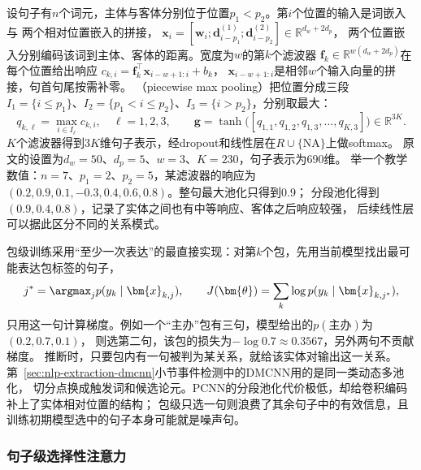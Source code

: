 设句子有$n$个词元，主体与客体分别位于位置$p_1<p_2$。第$i$个位置的输入是词嵌入与
两个相对位置嵌入的拼接，
$\bm{x}_i=[\bm{w}_i;\bm{d}^{(1)}_{i-p_1};\bm{d}^{(2)}_{i-p_2}]\in\mathbb{R}^{d_w+2d_p}$，
两个位置嵌入分别编码该词到主体、客体的距离。宽度为$w$的第$k$个滤波器
$\bm{f}_k\in\mathbb{R}^{w(d_w+2d_p)}$在每个位置给出响应
$c_{k,i}=\bm{f}_k^{\top}\bm{x}_{i-w+1:i}+b_k$，
$\bm{x}_{i-w+1:i}$是相邻$w$个输入向量的拼接，句首句尾按需补零。
（piecewise max pooling）把位置分成三段
$I_1=\{i\leq p_1\}$、$I_2=\{p_1<i\leq p_2\}$、$I_3=\{i>p_2\}$，分别取最大：
\begin{equation}
  q_{k,\ell}=\max_{i\in I_\ell}c_{k,i},\quad \ell=1,2,3,\qquad
  \bm{g}=\tanh\bigl([q_{1,1},q_{1,2},q_{1,3},\ldots,q_{K,3}]\bigr)\in\mathbb{R}^{3K}.
  \label{eq:nlp-extraction-pcnn}
\end{equation}
$K$个滤波器得到$3K$维句子表示，经dropout和线性层在$R\cup\{\mathrm{NA}\}$上做softmax。
原文的设置为$d_w=50$、$d_p=5$、$w=3$、$K=230$，句子表示为690维。
举一个教学数值：$n=7$、$p_1=2$、$p_2=5$，某滤波器的响应为
$(0.2,0.9,0.1,-0.3,0.4,0.6,0.8)$。整句最大池化只得到0.9；
分段池化得到$(0.9,0.4,0.8)$，记录了实体之间也有中等响应、客体之后响应较强，
后续线性层可以据此区分不同的关系模式。

包级训练采用“至少一次表达”的最直接实现：对第$k$个包，先用当前模型找出最可能表达包标签的句子，
\[
  j^{*}=\argmax_{j}p(y_k\mid\bm{x}_{k,j}),\qquad
  J(\bm{\theta})=\sum_{k}\log p(y_k\mid\bm{x}_{k,j^{*}}),
\]
只用这一句计算梯度。例如一个“主办”包有三句，模型给出的$p(\text{主办})$为$(0.2,0.7,0.1)$，
则选第二句，该包的损失为$-\log0.7\approx0.3567$，另外两句不贡献梯度。
推断时，只要包内有一句被判为某关系，就给该实体对输出这一关系。
第~\ref{sec:nlp-extraction-dmcnn}小节事件检测中的DMCNN用的是同一类动态多池化，
切分点换成触发词和候选论元。PCNN的分段池化代价极低，却给卷积编码补上了实体相对位置的结构；
包级只选一句则浪费了其余句子中的有效信息，且训练初期模型选中的句子本身可能就是噪声句。

\subsubsection{句子级选择性注意力}
\label{sec:nlp-extraction-selective-attention}

